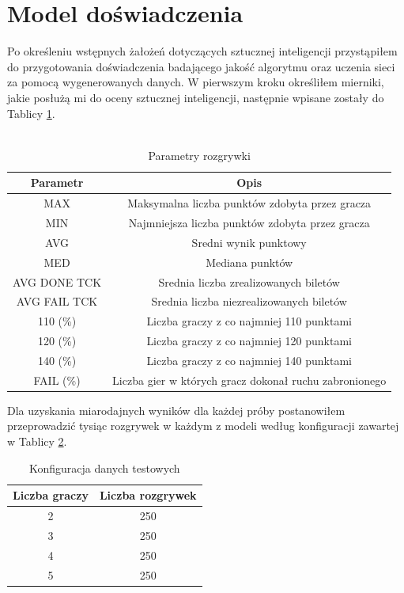 \documentclass[12pt, oneside]{report}
\begin{document}
\section{Model doświadczenia}
Po określeniu wstępnych żałożeń dotyczących sztucznej inteligencji przystąpiłem do przygotowania doświadczenia badającego jakość algorytmu oraz uczenia sieci za pomocą wygenerowanych danych. W pierwszym kroku określiłem mierniki, jakie posłużą mi do oceny sztucznej inteligencji, następnie wpisane zostały do Tablicy \ref{table:outputparam}. \\ \\
\begin{table}[h]
	\begin{center}
		\begin{tabular}{| c | c |} \hline
			Parametr  & Opis \\ \hline
			MAX & Maksymalna liczba punktów zdobyta przez gracza \\ \hline
			MIN & Najmniejsza liczba punktów zdobyta przez gracza \\ \hline
			AVG & Sredni wynik punktowy \\ \hline
			MED & Mediana punktów \\ \hline
			AVG DONE TCK & Srednia liczba zrealizowanych biletów \\ \hline
			AVG FAIL TCK & Srednia liczba niezrealizowanych biletów \\ \hline
			110 (\%) & Liczba graczy z co najmniej 110 punktami \\ \hline
			120 (\%) & Liczba graczy z co najmniej 120 punktami \\ \hline
			140 (\%) & Liczba graczy z co najmniej 140 punktami \\ \hline
			FAIL (\%) & Liczba gier w których gracz dokonał ruchu zabronionego \\ \hline
		\end{tabular}
		\caption{Parametry rozgrywki}
		\label{table:outputparam}
	\end{center}
\end{table}
Dla uzyskania miarodajnych wyników dla każdej próby postanowiłem przeprowadzić tysiąc rozgrywek w każdym z modeli według konfiguracji zawartej w Tablicy \ref{table:gameconfig}. 
\begin{table}[h]
	\begin{center}
		\begin{tabular}{| c | c |} \hline
			Liczba graczy & Liczba rozgrywek \\ \hline
			2 & 250 \\ \hline
			3 & 250 \\ \hline
			4 & 250 \\ \hline
			5 & 250 \\ \hline
		\end{tabular}
		\caption{Konfiguracja danych testowych}
		\label{table:gameconfig}
	\end{center}
\end{table}
\end{document}
